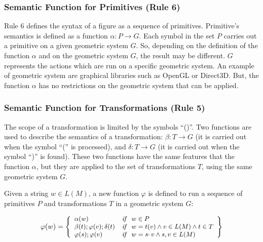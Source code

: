 \documentclass[runningheads]{llncs}
\begin{document}
\subsubsection{Semantic Function for Primitives (Rule 6)
\label{sec:rule6}}

Rule 6 defines the syntax of a figure as a sequence of primitives. Primitive's semantics is defined
as a function $\alpha: P \rightarrow G$. Each symbol in the set $P$ carries out a primitive on a given geometric
system $G$. So, depending on the definition of the function $\alpha$ and on the geometric system $G$, the result
may be different. $G$ represents the actions which are run on a specific geometric system. An example
of geometric system are graphical libraries such as OpenGL or Direct3D. But, the function $\alpha$ has no
restrictions on the geometric system that can be applied.



\subsubsection{Semantic Function for Transformations (Rule 5)
\label{sec:rule5}}

The scope of a transformation is
limited by the symbols ``()''. Two functions are used to describe the semantics
of a transformation: $\beta: T \rightarrow G$ (it is carried out when the symbol ``('' is
processed), and $\delta: T \rightarrow G$ (it is carried out when the symbol ``)'' is found).
These two functions have the same features that the function $\alpha$, but they
are applied to the set of transformations $T$, using the same geometric system
$G$.

Given a string $w \in L(M)$, a new function $\varphi$ is defined to run a sequence of primitives $P$
and transformations $T$ in a geometric system $G$:


\begin{equation}
\begin{small}
    \varphi (w) = \left\{
    \begin{array}{ll}
        \alpha(w) & \mathit{if} \ \ w \in P  \\

        \beta(t); \varphi(v); \delta(t) & \mathit{if} \ \ w = t(v) \wedge v \in L(M) \wedge t \in T \\

        \varphi(s); \varphi(v)  & \mathit{if} \ \ w = s \cdotp v \wedge s, v \in L(M)
    \end{array}\right\}
\end{small}
\end{equation}
\end{document}
